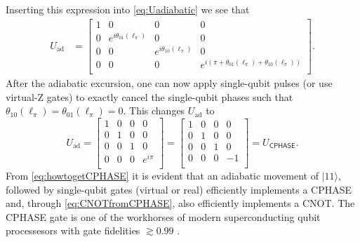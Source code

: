 \documentclass[aip,apr,twocolumn,showpacs,superscriptaddress,groupedaddress,nofootinbib,reprint]{revtex4-1}  %
\newcommand{\CNOT}{\textsf{CNOT}}
\newcommand{\CPHASE}{\textsf{CPHASE}}
\begin{document}
Inserting this expression into \cref{eq:Uadiabatic} we see that
\begin{align}
 U_\text{ad} &= \begin{bmatrix}
1 & 0 & 0 & 0 \\
0 & e^{i\theta_{01}(\ell_\pi)} & 0 & 0 \\
0 & 0 & e^{i\theta_{10}(\ell_\pi)} & 0 \\
0 & 0 & 0 & e^{i(\pi + \theta_{01}(\ell_\pi) + \theta_{10}(\ell_\pi))} \\
\end{bmatrix}.
\label{eq:Uadfixedphase}
\end{align}
After the adiabatic excursion, one can now apply single-qubit pulses (or use virtual-\textsf{Z} gates) to exactly cancel the single-qubit phases such that $\theta_{10}(\ell_\pi) = \theta_{01}(\ell_\pi) = 0$. This changes $U_\text{ad}$ to
\begin{equation}
U_\text{ad} = \begin{bmatrix}
1 & 0 & 0 & 0 \\
0 & 1 & 0 & 0 \\
0 & 0 & 1 & 0 \\
0 & 0 & 0 & e^{i\pi} \\
\end{bmatrix} =
\begin{bmatrix}
1 & 0 & 0 & 0 \\
0 & 1 & 0 & 0 \\
0 & 0 & 1 & 0 \\
0 & 0 & 0 & -1 \\
\end{bmatrix} =
 U_\CPHASE{}. \label{eq:howtogetCPHASE}
\end{equation}
From \cref{eq:howtogetCPHASE} it is evident that an adiabatic movement of $|11\rangle$, followed by single-qubit gates (virtual or real) efficiently implements a \CPHASE{} and, through \cref{eq:CNOTfromCPHASE}, also efficiently implements a \CNOT{}. The \CPHASE{} gate is one of the workhorses of modern superconducting qubit processesors with gate fidelities $\gtrsim 0.99$ \cite{Barends2014,Kelly2014}.
\end{document}
